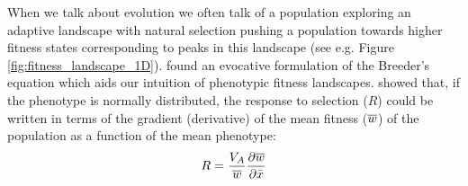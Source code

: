 When we talk about evolution we often talk of a population
exploring an adaptive landscape with natural selection pushing a population
towards higher fitness states corresponding to peaks in this landscape
(see e.g. Figure \ref{fig:fitness_landscape_1D}).  
\citet{lande1976natural} found an evocative formulation of the
Breeder's equation which aids our intuition of phenotypic fitness
landscapes.
 
\citeauthor{lande1976natural} showed that, if the phenotype is
normally distributed, the response to
selection ($R$) could be written in terms of the gradient (derivative) of the
mean fitness ($\overline{w}$) of the population as a function of the mean phenotype:  
\begin{equation}
  R = \frac{V_A}{\wbar} \frac{\partial \wbar}{\partial \bar{x}}  %
\end{equation}

